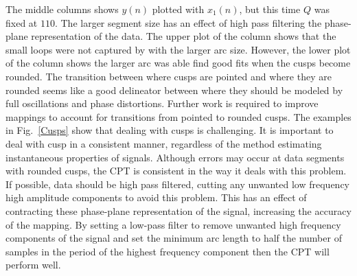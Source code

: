 \documentclass[11pt,draftcls,onecolumn]{IEEEtran}
\begin{document}
The middle columns shows $y(n)$ plotted with $x_1(n)$, but this time $Q$ was fixed at $110$. The larger segment size has an effect of high pass filtering the phase-plane representation of the data. The upper plot of the column shows that the small loops were not captured by with the larger arc size. However, the lower plot of the column shows the larger arc was able find good fits when the cusps become rounded.
The transition between where cusps are pointed and where they are rounded seems like a good delineator between where they should be modeled by full oscillations and phase distortions. Further work is required to improve mappings to account for transitions from pointed to rounded cusps. 
The examples in Fig.~\ref{Cusps} show that dealing with cusps is challenging. It is important to deal with cusp in a consistent manner, regardless of the method estimating instantaneous properties of signals. Although errors may occur at data segments with rounded cusps, the CPT is consistent in the way it deals with this problem. If possible, data should be high pass filtered, cutting any unwanted low frequency high amplitude components to avoid this problem. This has an effect of contracting these phase-plane representation of the signal, increasing the accuracy of the mapping. By setting a low-pass filter to remove unwanted high frequency components of the signal and set the minimum arc length to half the number of samples in the period of the highest frequency component then the CPT will perform well. 
% 
\end{document}
